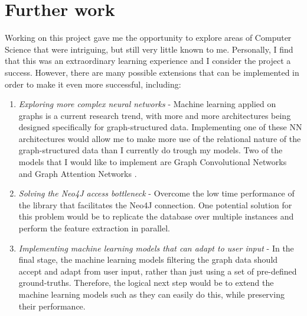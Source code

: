 	\section{Further work}
		Working on this project gave me the opportunity to explore areas of Computer Science that were intriguing, but still very little known to me. Personally, I find that this was an extraordinary learning experience and I consider the project a success. However, there are many possible extensions that can be implemented in order to make it even more successful, including:
		\begin{enumerate}
			\item \textit{Exploring more complex neural networks} - Machine learning applied on graphs is a current research trend, with more and more architectures being designed specifically for graph-structured data. Implementing one of these NN architectures would allow me to make more use of the relational nature of the graph-structured data than I currently do trough my models. Two of the models that I would like to implement are Graph Convolutional Networks \cite{kipf2017semi} and Graph Attention Networks \cite{2017arXiv171010903V}.
			
			\item \textit{Solving the Neo4J access bottleneck} - Overcome the low time performance of the library that facilitates the Neo4J connection. One potential solution for this problem would be to replicate the database over multiple instances and perform the feature extraction in parallel. 
				
			\item \textit{Implementing machine learning models that can adapt to user input } - In the final stage, the machine learning models filtering the graph data should accept and adapt from user input, rather than just using a set of pre-defined ground-truths. Therefore, the logical next step would be to extend the machine learning models such as they can easily do this, while preserving their performance.
	\end{enumerate}
	
